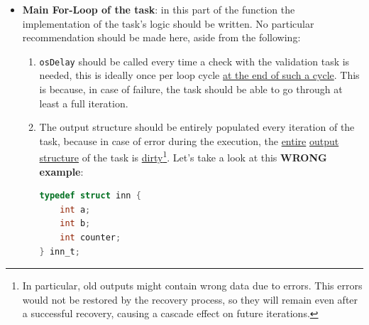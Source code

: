 \documentclass[a4paper, 12pt]{article}
\begin{document}
\begin{onehalfspace}
\begin{enumerate}
{\begin{itemize}
{\begin{lstlisting}[language=C]
  //-- header of the task --
  int result;
  outputFibonacci_t * output;
  inputFibonacci_t * input;

  // this is fine.
  input = (inputFibonacci_t*) xGetInput();
  output= (outputFibonacci_t*) xGetOutput();

  // hard coded intialization BROKE RECOVERY
  input->n_previous = 0;
  input->n_current = 1;

  //-- main for loop --
  for(;;){
    //for loop code
  }
}      
    \end{lstlisting}
    In this example we first declare and get the input and output structure. You can safely call \texttt{xGetInput} and \texttt{xGetOutput} inside the header of the task as those are special function that do handle data integrity checks during recovery period (meaning that if an error occurs during the task execution this function will return prior-failure data).
    \begin{lstlisting}[language=C]
// hard coded intialization BROKE RECOVERY
input->n_previous = 0;
input->n_current = 1;
    \end{lstlisting}
    This however breaks the recovery process. This is due to the fact that at iteration $x$, when a failure happens, the value of the input structure should be restored to $x-1$ iteration, but they are overridden by those two upper lines of code resulting in a broken recovery process.
        }
    \item { \textbf{Main For-Loop of the task}: in this part of the function the implementation of the task's logic should be written. No particular recommendation should be made here, aside from the following:
    \begin{enumerate}
        \item {\texttt{osDelay} should be called every time a check with the validation task is needed, this is ideally once per loop cycle \underline{at the end of such a cycle}. This is because, in case of failure, the task should be able to go through at least a full iteration. }
        \item {The output structure should be entirely populated every iteration of the task, because in case of error during the execution, the \underline{entire} \underline{output structure} of the task is \underline{dirty}\footnote{In particular, old outputs might contain wrong data due to errors. This errors would not be restored by the recovery process, so they will remain even after a successful recovery, causing a cascade effect on future iterations.}. Let's take a look at this \textbf{WRONG example}:
        \begin{lstlisting}[language=C]
typedef struct inn {
    int a;
    int b;
    int counter;
} inn_t;


\end{lstlisting}}
\end{enumerate}}
\end{itemize}}
\end{enumerate}
\end{onehalfspace}
\end{document}
